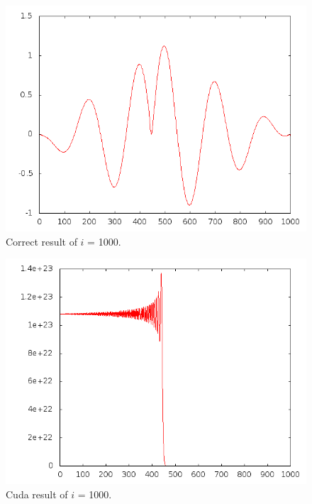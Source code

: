 \documentclass[10pt]{article}
\begin{document}
\begin{figure}[h]
  \centering
    \includegraphics[width=\textwidth]{assign1_1000.png}
  \caption{Correct result of $i$ = 1000.}
\end{figure}
\break
\begin{figure}[h]
  \centering
    \includegraphics[width=\textwidth]{assign4_1000.png}
  \caption{Cuda result of $i$ = 1000.}
\end{figure}
\break
\end{document}
